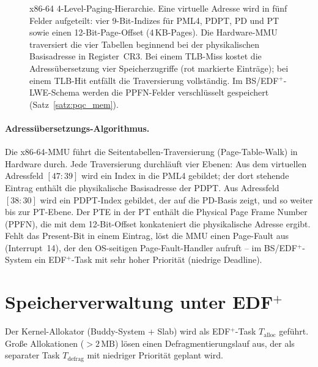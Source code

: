﻿\documentclass[a4paper,12pt]{scrreprt}
\theoremstyle{definition}
\begin{document}
\begin{figure}[H]
		\caption{x86-64 4-Level-Paging-Hierarchie. Eine virtuelle Adresse wird in
			fünf Felder aufgeteilt: vier 9-Bit-Indizes für PML4, PDPT, PD und PT
			sowie einen 12-Bit-Page-Offset (4\,KB-Pages). Die Hardware-MMU traversiert
			die vier Tabellen beginnend bei der physikalischen Basisadresse in
			Register~CR3. Bei einem TLB-Miss kostet die Adressübersetzung vier
			Speicherzugriffe (rot markierte Einträge); bei einem TLB-Hit entfällt
			die Traversierung vollständig. Im BS/EDF$^+$-LWE-Schema werden die
			PPFN-Felder verschlüsselt gespeichert (Satz~\ref{satz:pqc_mem}).}
		\label{fig:paging}
	\end{figure}

	\paragraph{Adressübersetzungs-Algorithmus.}
	Die x86-64-MMU führt die Seitentabellen-Traversie\-rung (Page-Table-Walk)
	in Hardware durch. Jede Traversierung durchläuft vier Ebenen: Aus dem
	virtuellen Adressfeld $[47:39]$ wird ein Index in die PML4 gebildet;
	der dort stehende Eintrag enthält die physikalische Basisadresse der PDPT.
	Aus Adressfeld $[38:30]$ wird ein PDPT-Index gebildet, der auf die PD-Basis
	zeigt, und so weiter bis zur PT-Ebene. Der PTE in der PT enthält die
	Physical Page Frame Number (PPFN), die mit dem 12-Bit-Offset konkateniert
	die physikalische Adresse ergibt. Fehlt das Present-Bit in einem Eintrag,
	löst die MMU einen Page-Fault aus (Interrupt~14), der den OS-seitigen
	Page-Fault-Handler aufruft -- im BS/EDF$^+$-System ein EDF$^+$-Task
	mit sehr hoher Priorität (niedrige Deadline).

	\section{Speicherverwaltung unter \texorpdfstring{EDF$^+$}{EDF+}}

	Der Kernel-Allokator (Buddy-System + Slab) wird als EDF$^+$-Task
	$T_{\mathrm{alloc}}$ geführt. Große Allokationen ($> 2\,\mathrm{MB}$)
	lösen einen Defragmentierungslauf aus, der als separater Task
	$T_{\mathrm{defrag}}$ mit niedriger Priorität geplant wird.
\end{document}
